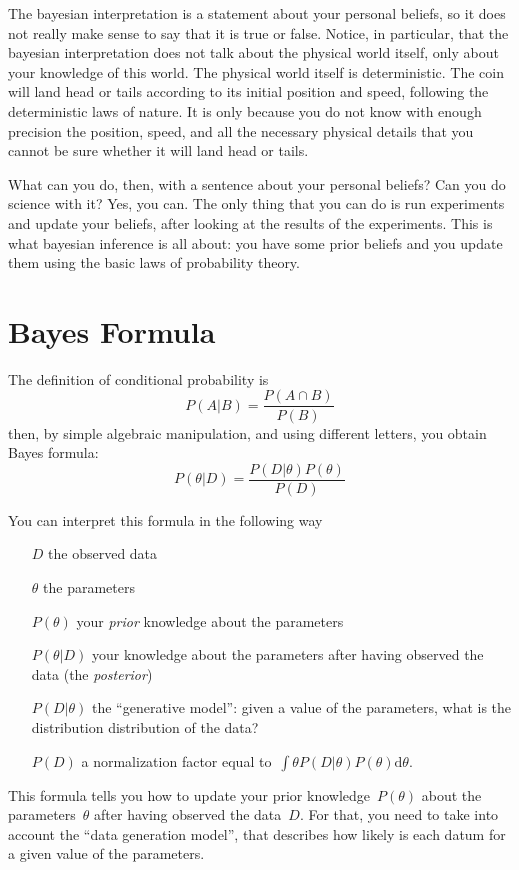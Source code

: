 The bayesian interpretation is a statement about your personal beliefs, so it
does not really make sense to say that it is true or false.  Notice, in
particular, that the bayesian interpretation does not talk about the physical
world itself, only about your knowledge of this world.  The physical world
itself is deterministic.  The coin will land head or tails according to its
initial position and speed, following the deterministic laws of nature.  It
is only because you do not know with enough precision the position, speed,
and all the necessary physical details that you cannot be sure whether it
will land head or tails.

What can you do, then, with a sentence about your personal beliefs?  Can you
do science with it?  Yes, you can.  The only thing that you can do is run
experiments and update your beliefs, after looking at the results of the
experiments.  This is what bayesian inference is all about: you have some
prior beliefs and you update them using the basic laws of probability theory.

\section{Bayes Formula}

The definition of conditional probability is
$$
P(A|B)=\frac{P(A\cap B)}{P(B)}
$$
then, by simple algebraic manipulation, and using different letters, you
obtain Bayes formula:
$$
P(\theta|D)=\frac{P(D|\theta)P(\theta)}{P(D)}
$$

You can interpret this formula in the following way

\begin{itemize}
	\item[$D$] the observed data
	\item[$\theta$] the parameters
	\item[$P(\theta)$] your \emph{prior} knowledge about the parameters
	\item[$P(\theta|D)$] your knowledge about the parameters after having
		observed the data (the \emph{posterior})
	\item[$P(D|\theta)$] the ``generative model'': given a value of the
		parameters, what is the distribution distribution of the data?
	\item[$P(D)$] a normalization factor equal to~$\int\theta
		P(D|\theta)P(\theta)\mathrm{d}\theta$.
\end{itemize}

This formula tells you how to update your prior knowledge~$P(\theta)$ about
the parameters~$\theta$ after having observed the data~$D$.  For that, you
need to take into account the ``data generation model'', that describes how
likely is each datum for a given value of the parameters.

